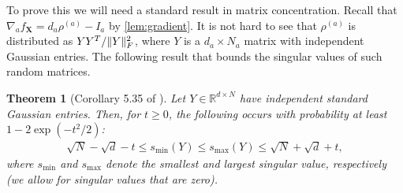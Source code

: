 \documentclass{article}
\newtheorem{theorem}{Theorem}
\DeclarePairedDelimiter{\norm}{\lVert}{\rVert}
\newcommand{\R}{{\mathbb{R}}}
\renewcommand{\vec}{\bm}
\begin{document}
To prove this we will need a standard result in matrix concentration.
Recall that $\nabla_a f_{\vec X} = d_a \rho^{(a)} - I_a$ by \cref{lem:gradient}.
It is not hard to see that $\rho^{(a)}$ is distributed as $Y Y^T / \norm{Y}_F^2$, where $Y$ is a $d_a \times N_a$ matrix with independent Gaussian entries.
The following result that bounds the singular values of such random matrices.

\begin{theorem}[Corollary 5.35 of \cite{vershynin2010introduction}]\label{cor:vershynin}
Let $Y \in \R^{d \times N}$ have independent standard Gaussian entries.
Then, for $t \geq 0$, the following occurs with probability at least $1 - 2 \exp(-t^{2}/2)$:
\begin{align*}
  \sqrt{N} - \sqrt{d} - t \leq s_{\min}(Y) \leq s_{\max}(Y) \leq \sqrt{N} + \sqrt{d} + t,
\end{align*}
where $s_{\min}$ and $s_{\max}$ denote the smallest and largest singular value, respectively (we allow for singular values that are zero).
\end{theorem}
\end{document}
